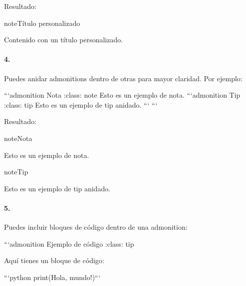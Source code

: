 \documentclass[a4paper,10pt,spanish]{sphinxmanual}
\begin{document}
\sphinxAtStartPar
Resultado:

\begin{sphinxadmonition}{note}{Título personalizado}

\sphinxAtStartPar
Contenido con un título personalizado.
\end{sphinxadmonition}


\paragraph{4. }
\label{\detokenize{configuracion_inicial/013.guia_de_myst_parser:admonitions-anidadas}}
\sphinxAtStartPar
Puedes anidar admonitions dentro de otras para mayor claridad. Por ejemplo:

\begin{sphinxVerbatim}[commandchars=\\\{\}]
    ```\PYGZob{}admonition\PYGZcb{} Nota :class: note Esto es un ejemplo de nota. 
      ```\PYGZob{}admonition\PYGZcb{} Tip :class: tip Esto es un ejemplo de tip anidado. ```
    ```
\end{sphinxVerbatim}

\sphinxAtStartPar
Resultado:

\begin{sphinxadmonition}{note}{Nota}

\sphinxAtStartPar
Esto es un ejemplo de nota.

\begin{sphinxadmonition}{note}{Tip}

\sphinxAtStartPar
Esto es un ejemplo de tip anidado. \textasciigrave{}\textasciigrave{}\textasciigrave{}
\end{sphinxadmonition}
\end{sphinxadmonition}


\paragraph{5. }
\label{\detokenize{configuracion_inicial/013.guia_de_myst_parser:admonitions-con-bloques-de-codigo}}
\sphinxAtStartPar
Puedes incluir bloques de código dentro de una admonition:

\begin{sphinxVerbatim}[commandchars=\\\{\}]
```\PYGZob{}admonition\PYGZcb{} Ejemplo de código
:class: tip

Aquí tienes un bloque de código:

```python
print(\PYGZdq{}Hola, mundo!\PYGZdq{})``` 
\end{sphinxVerbatim}
\end{document}
